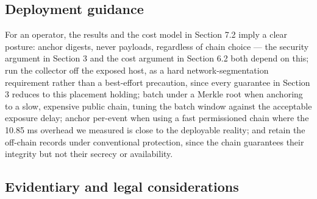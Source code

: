 \documentclass[journal]{IEEEtran}
\begin{document}
\subsection{Deployment guidance}

For an operator, the results and the cost model in Section 7.2 imply a clear posture: anchor digests, never payloads, regardless of chain choice --- the security argument in Section 3 and the cost argument in Section 6.2 both depend on this; run the collector off the exposed host, as a hard network-segmentation requirement rather than a best-effort precaution, since every guarantee in Section 3 reduces to this placement holding; batch under a Merkle root when anchoring to a slow, expensive public chain, tuning the batch window against the acceptable exposure delay; anchor per-event when using a fast permissioned chain where the 10.85 ms overhead we measured is close to the deployable reality; and retain the off-chain records under conventional protection, since the chain guarantees their integrity but not their secrecy or availability.

\subsection{Evidentiary and legal considerations}
\end{document}
